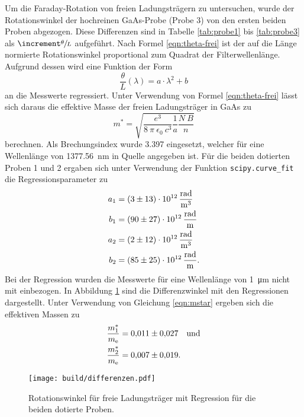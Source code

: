 Um die Faraday-Rotation von freien Ladungsträgern zu untersuchen,
wurde der Rotationswinkel der hochreinen GaAs-Probe (Probe 3)
von den ersten beiden Proben abgezogen. Diese Differenzen sind
in Tabelle \ref{tab:probe1} bis \ref{tab:probe3}
als $\increment\sfrac{\theta}{L}$ aufgeführt.
Nach Formel \eqref{eqn:theta-frei} ist der auf die Länge normierte
Rotationswinkel proportional zum Quadrat der Filterwellenlänge.
Aufgrund dessen wird eine Funktion der Form
\begin{equation*}
  \frac{\theta}{L}\left(\lambda\right) = a \cdot \lambda^2 + b
\end{equation*}
an die Messwerte regressiert.
Unter Verwendung von Formel \eqref{eqn:theta-frei} lässt sich daraus die
effektive Masse der freien Ladungsträger in GaAs zu
\begin{equation}
  m^* = \sqrt{\frac{e^3}{8\:\pi\:\epsilon_0\:c^3}
  \frac{1}{a}\frac{N\:B}{n}}
  \label{eqn:mstar}
\end{equation}
berechnen.
Als Brechungsindex wurde \num{3.397} eingesetzt, welcher für eine
Wellenlänge von \SI{1377.56}{\nano\meter} in Quelle \cite{filmetrics} angegeben ist.
Für die beiden dotierten Proben 1 und 2 ergaben sich unter Verwendung
der Funktion \texttt{scipy.curve\_fit} die Regressionsparameter zu
\begin{align*}
  a_1 &= \SI{03(13)e12}{\radian\per\raiseto{3}\meter} \\
  b_1 &= \SI{90(27)e12}{\radian\per\meter} \\
  a_2 &= \SI{02(12)e12}{\radian\per\raiseto{3}\meter} \\
  b_2 &= \SI{85(25)e12}{\radian\per\meter}.
\end{align*}
Bei der Regression wurden die Messwerte für eine Wellenlänge von
\SI{1}{\micro\meter} nicht mit einbezogen.
In Abbildung \ref{fig:differenzen} sind die Differenzwinkel mit den
Regressionen dargestellt.
Unter Verwendung von Gleichung \eqref{eqn:mstar} ergeben sich die
effektiven Massen zu
\begin{align*}
  \frac{m^*_1}{m_\text{e}} &= \num{0.011(27)} \text{\quad und} \\
  \frac{m^*_2}{m_\text{e}} &= \num{0.007(19)}.
\end{align*}

\begin{figure}
  \centering
  \texttt{[image: build/differenzen.pdf]}
  \caption{Rotationswinkel für freie Ladungsträger mit Regression für die beiden
  dotierte Proben.}
  \label{fig:differenzen}
\end{figure}
